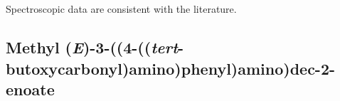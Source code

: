 \\[1\baselineskip]
\\[1\baselineskip]
Spectroscopic data are consistent with the literature\cite{Baker2012,Scribner1978}.


%
%

\subsection{Methyl (\textit{E})-3-((4-((\textit{tert}-butoxycarbonyl)amino)phenyl)amino)dec-2-enoate }

